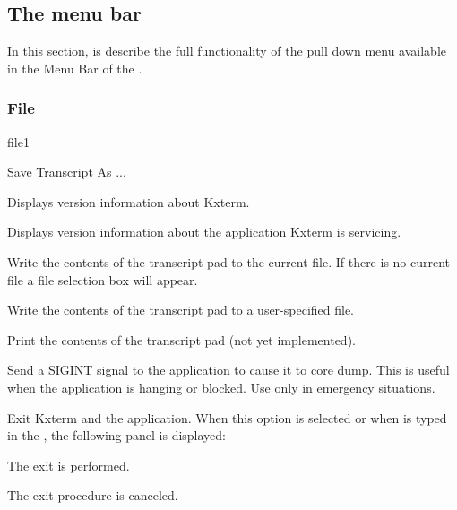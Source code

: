 \subsection{The \EW{} menu bar}
In this section, is describe the full functionality of the pull down
menu available in the Menu Bar of the \EW.


\subsubsection{File}

\begin{PAWf}{file1}
\begin{DLsf}{Save Transcript As ...}
\item[About Kxterm...]
         Displays version information about Kxterm.
\item[About <Application>...]
         Displays version information about the application
         Kxterm is servicing.
\item[Save Transcript]
         Write the contents of the transcript pad to the current
         file. If there is no current file a file selection box
         will appear.
\item[Save Transcript As...]
         Write the contents of the transcript pad to a user-specified
         file.
\item[Print...]
         Print the contents of the transcript pad (not yet implemented).
\item[Kill]
         Send a SIGINT signal to the application to cause it to
         core dump. This is useful when the application is hanging or
         blocked. Use only in emergency situations.
\item[Exit]
         Exit Kxterm and the application. When this option is selected
         or when  is typed in the \IP, the following panel is 
         displayed:
\end{DLsf}
\end{PAWf}

\begin{EnumZB}
\item  The exit is performed.
\item  The exit procedure is canceled.
\end{EnumZB}

